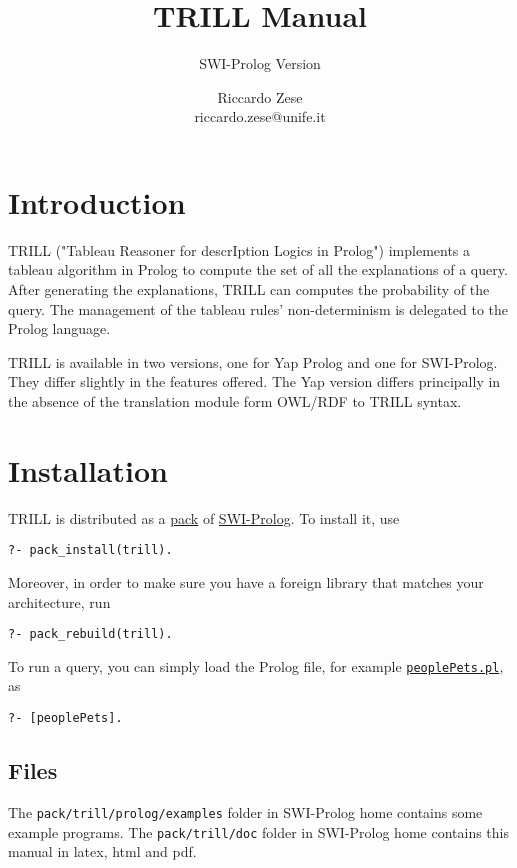 \documentclass[a4paper,10pt]{scrartcl}
\begin{document}
\title{TRILL Manual}

\subtitle{SWI-Prolog Version}

\author{Riccardo Zese\\
riccardo.zese@unife.it}

\maketitle


\section{Introduction}


TRILL ("Tableau Reasoner for descrIption Logics in Prolog") implements a tableau algorithm in
Prolog to compute the set of all the explanations of a query. After generating the explanations, 
TRILL can computes the probability of the query. The management of the tableau rules' non-determinism is delegated to the Prolog language.

TRILL is available in two versions, one for Yap Prolog and one for SWI-Prolog. They differ slightly in the features offered.
The Yap version differs principally in the absence of the translation module form OWL/RDF to TRILL syntax.

\section{Installation}
TRILL is distributed as a \href{http://www.swi-prolog.org/pack/list?p=cplint}{pack} of \href{http://www.swi-prolog.org/}{SWI-Prolog}. To install it, use
\begin{verbatim}
?- pack_install(trill).
\end{verbatim}
Moreover, in order to make sure you have a foreign library that matches your architecture, run
\begin{verbatim}
?- pack_rebuild(trill). 
\end{verbatim}







To run a query, you can simply load the Prolog file, for example \href{http://trill.lamping.unife.it/example/trill/peoplePets.pl}{\texttt{peoplePets.pl}}, as
\begin{verbatim}
?- [peoplePets].
\end{verbatim}


\subsection{Files}
The \texttt{pack/trill/prolog/examples} folder in SWI-Prolog home contains some example programs.
The \texttt{pack/trill/doc} folder in SWI-Prolog home contains this manual in latex, html and pdf.
\end{document}
